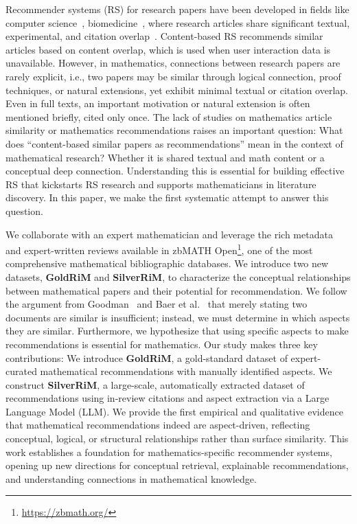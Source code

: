 \documentclass[sigconf,anonymous]{acmart}
\begin{document}
Recommender systems (RS) for research papers have been developed in fields like computer science~\cite{beel2016RSSurvey,zhang2023scholarlyRSLitSur}, biomedicine~\cite{2022KartRSBio,2019BilmedRSFeng}, where research articles share significant textual, experimental, and citation overlap~\cite{kreutz2022scientific,pinedo2025RSSurvey,2025BaaiLitSurvey}.
Content-based RS recommends similar articles based on content overlap, which is used when user interaction data is unavailable.
However, in mathematics, connections between research papers are rarely explicit, i.e., two papers may be similar through logical connection, proof techniques, or natural extensions, yet exhibit minimal textual or citation overlap.
Even in full texts, an important motivation or natural extension is often mentioned briefly, cited only once.
The lack of studies on mathematics article similarity or mathematics recommendations raises an important question: What does “content-based similar papers as recommendations” mean in the context of mathematical research?
Whether it is shared textual and math content or a conceptual deep connection.
Understanding this is essential for building effective RS that kickstarts RS research and supports mathematicians in literature discovery.
In this paper, we make the first systematic attempt to answer this question.

We collaborate with an expert mathematician and leverage the rich metadata and expert-written reviews available in zbMATH Open\footnote{\url{https://zbmath.org/}}, one of the most comprehensive mathematical bibliographic databases. 
We introduce two new datasets, \textbf{GoldRiM} and \textbf{SilverRiM}, to characterize the conceptual relationships between mathematical papers and their potential for recommendation.
We follow the argument from Goodman~\cite{goodman1972seven} and Baer et al.~\cite{bar2011reflective} that merely stating two documents are similar is insufficient; instead, we must determine in which aspects they are similar.
Furthermore, we hypothesize that using specific aspects to make recommendations is essential for mathematics.
Our study makes three key contributions:
We introduce \textbf{GoldRiM}, a gold-standard dataset of expert-curated mathematical recommendations with manually identified aspects.
We construct \textbf{SilverRiM}, a large-scale, automatically extracted dataset of recommendations using in-review citations and aspect extraction via a Large Language Model (LLM).
We provide the first empirical and qualitative evidence that mathematical recommendations indeed are aspect-driven, reflecting conceptual, logical, or structural relationships rather than surface similarity.
This work establishes a foundation for mathematics-specific recommender systems, opening up new directions for conceptual retrieval, explainable recommendations, and understanding connections in mathematical knowledge.
\end{document}
